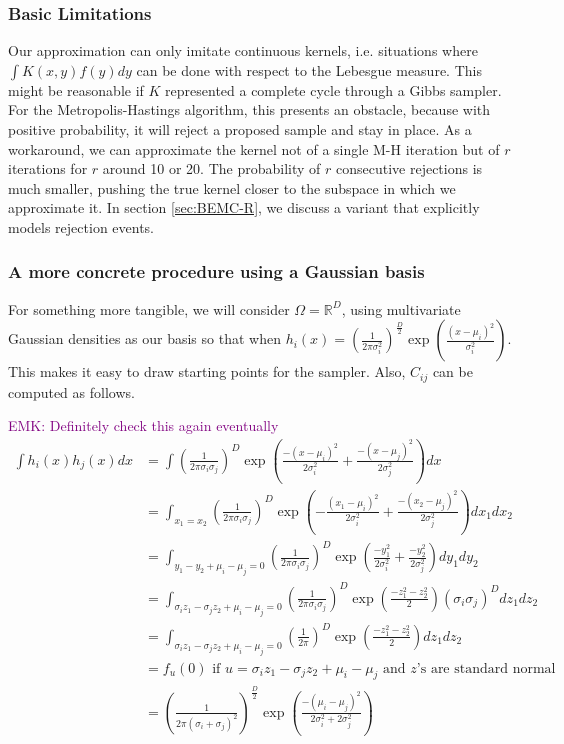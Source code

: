 \documentclass{article}
\newcommand\EMK[1]{\textcolor{purple}{EMK: #1}}
\begin{document}
\subsubsection{Basic Limitations}
Our approximation can only imitate continuous kernels, i.e. situations where $\int K(x,y)f(y)dy$ can be done with respect to the Lebesgue measure. This might be reasonable if $K$ represented a complete cycle through a Gibbs sampler. For the Metropolis-Hastings algorithm, this presents an obstacle, because with positive probability, it will reject a proposed sample and stay in place. As a workaround, we can approximate the kernel not of a single M-H iteration but of $r$ iterations for $r$ around 10 or 20. The probability of $r$ consecutive rejections is much smaller, pushing the true kernel closer to the subspace in which we approximate it. In section \ref{sec:BEMC-R}, we discuss a variant that explicitly models rejection events.

\subsubsection{A more concrete procedure using a Gaussian basis}
\label{sec: BEMC_concrete}
For something more tangible, we will consider $\Omega=\mathbb{R}^D$, using multivariate Gaussian densities as our basis so that when $h_i(x)= (\frac{1}{2\pi \sigma_i^2})^{\frac{D}{2}}\exp(\frac{(x-\mu_i)^2}{\sigma_i^2})$. This makes it easy to draw starting points for the sampler. Also, $C_{ij}$ can be computed as follows.

\EMK{Definitely check this again eventually}
\begin{align*}
\int h_i(x)h_j(x)dx &=\int (\frac{1}{2\pi \sigma_i\sigma_j})^{D}\exp(\frac{-(x-\mu_i)^2}{2\sigma_i^2}+\frac{-(x-\mu_j)^2}{2\sigma_j^2})dx\\
&=\int_{x_1=x_2} (\frac{1}{2\pi \sigma_i\sigma_j})^{D}\exp(-\frac{(x_1-\mu_i)^2}{2\sigma_i^2}+\frac{-(x_2-\mu_j)^2}{2\sigma_j^2})dx_1dx_2\\
&=\int_{y_1-y_2+\mu_i-\mu_j=0} (\frac{1}{2\pi \sigma_i\sigma_j})^{D}\exp(\frac{-y_1^2}{2\sigma_i^2}+\frac{-y_2^2}{2\sigma_j^2})dy_1dy_2\\
&=\int_{\sigma_iz_1-\sigma_jz_2+\mu_i-\mu_j=0}
 (\frac{1}{2\pi \sigma_i\sigma_j})^{D}
\exp(\frac{-z_1^2-z_2^2}{2})(\sigma_i\sigma_j)^D dz_1dz_2\\
&=\int_{\sigma_iz_1-\sigma_jz_2+\mu_i-\mu_j=0}
 (\frac{1}{2\pi })^{D}
\exp(\frac{-z_1^2-z_2^2}{2}) dz_1dz_2\\
&=f_u(0) \text{ if } u=\sigma_iz_1-\sigma_jz_2+\mu_i-\mu_j \text{ and $z$'s are standard normal}\\
&= (\frac{1}{2\pi (\sigma_i+\sigma_j)^2})^{\frac{D}{2}}\exp(\frac{-(\mu_i-\mu_j)^2}{2\sigma_i^2+2\sigma_j^2})
\end{align*}
\end{document}
